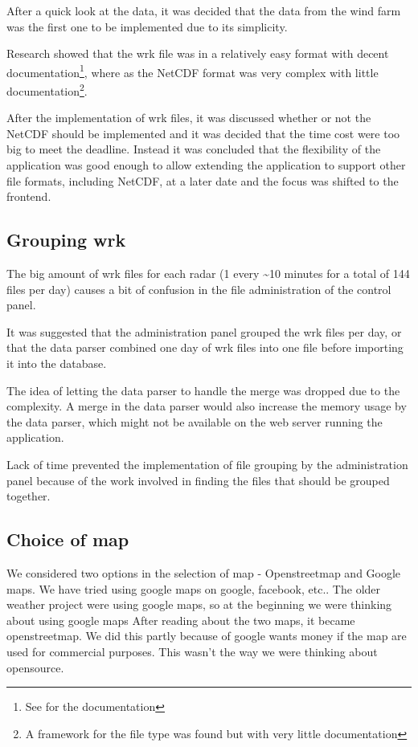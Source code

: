 After a quick look at the data, it was decided that the data from the wind farm was the first one to be implemented due to its simplicity.

Research showed that the wrk file was in a relatively easy format with decent documentation\footnote{See \cite{VRIS} for the documentation}, where as the NetCDF format was very complex with little documentation\footnote{A framework for the file type was found but with very little documentation}.

After the implementation of wrk files, it was discussed whether or not the NetCDF should be implemented and it was decided that the time cost were too big to meet the deadline. Instead it was concluded that the flexibility of the application was good enough to allow extending the application to support other file formats, including NetCDF, at a later date and the focus was shifted to the frontend.

\subsection{Grouping wrk}
The big amount of wrk files for each radar (1 every \textasciitilde 10 minutes for a total of 144 files per day) causes a bit of confusion in the file administration of the control panel.

It was suggested that the administration panel grouped the wrk files per day, or that the data parser combined one day of wrk files into one file before importing it into the database.

The idea of letting the data parser to handle the merge was dropped due to the complexity. A merge in the data parser would also increase the memory usage by the data parser, which might not be available on the web server running the application.

Lack of time prevented the implementation of file grouping by the administration panel because of the work involved in finding the files that should be grouped together.

\subsection{Choice of map}
We considered two options in the selection of map - Openstreetmap and Google maps. We have tried using google maps on google, facebook, etc.. The older weather project were using google maps, so at the beginning we were thinking about using google maps
After reading about the two maps, it became openstreetmap. We did this partly because of google wants money if the map are used for commercial purposes. This wasn't the way we were thinking about opensource.


